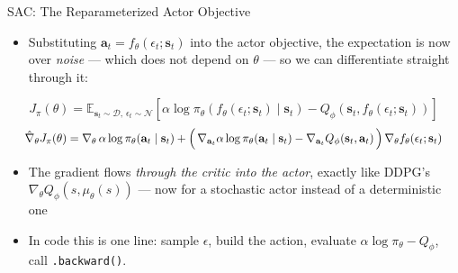 \begin{frame}{SAC: The Reparameterized Actor Objective}
\small
\begin{itemize}
    \item Substituting $\mathbf{a}_t = f_\theta(\epsilon_t;\mathbf{s}_t)$ into the actor objective, the expectation is now over \emph{noise} --- which does not depend on $\theta$ --- so we can differentiate straight through it:
\end{itemize}
\[
J_\pi(\theta) = \mathbb{E}_{\mathbf{s}_t \sim \mathcal{D},\, \epsilon_t \sim \mathcal{N}}\!\left[ \alpha \log \pi_\theta(f_\theta(\epsilon_t; \mathbf{s}_t) \mid \mathbf{s}_t) - Q_\phi(\mathbf{s}_t, f_\theta(\epsilon_t; \mathbf{s}_t)) \right]
\]
\[
\resizebox{0.96\linewidth}{!}{$\displaystyle
\hat{\nabla}_\theta J_\pi(\theta) = \nabla_\theta\, \alpha \log\pi_\theta(\mathbf{a}_t \mid \mathbf{s}_t) + \Big(\, \nabla_{\mathbf{a}_t} \alpha \log\pi_\theta(\mathbf{a}_t \mid \mathbf{s}_t) - \nabla_{\mathbf{a}_t} Q_\phi(\mathbf{s}_t, \mathbf{a}_t) \,\Big)\, \nabla_\theta f_\theta(\epsilon_t; \mathbf{s}_t)
$}
\]
\vspace{-0.2em}
\begin{itemize}
    \item[$\Rightarrow$] The gradient flows \emph{through the critic into the actor}, exactly like DDPG's $\nabla_\theta Q_\phi(s,\mu_\theta(s))$ --- now for a stochastic actor instead of a deterministic one
    \item[] {\footnotesize In code this is one line: sample $\epsilon$, build the action, evaluate $\alpha\log\pi_\theta - Q_\phi$, call \texttt{.backward()}.}
\end{itemize}
\end{frame}
